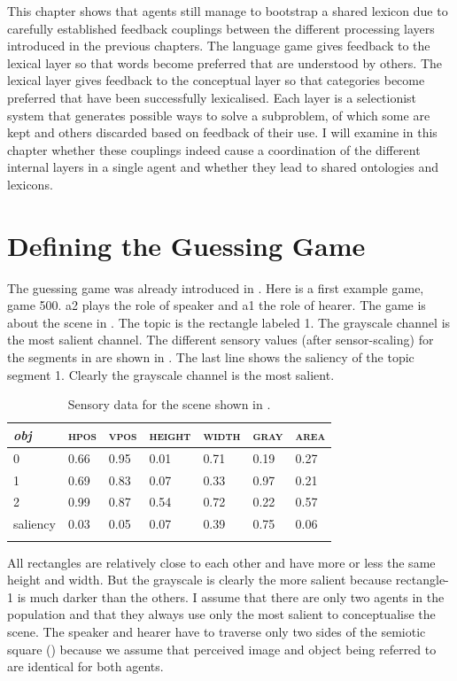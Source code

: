This chapter shows that agents still manage to 
bootstrap a shared lexicon due to carefully established
feedback couplings between the different processing
layers introduced in the previous chapters. 
The language game gives feedback to the lexical layer so 
that words become preferred that are understood by others.
The lexical layer gives feedback to the conceptual layer
so that categories become preferred that have been
successfully lexicalised. Each layer is a selectionist system
that generates possible ways to solve a subproblem, of which some 
are kept and others discarded based on feedback of their use.
I will examine in this chapter whether these
couplings indeed cause a coordination of the different internal
layers in a single agent and whether they lead to shared 
ontologies and lexicons. 

\section{Defining the Guessing Game}

The guessing game was already introduced in . Here is a first example game, game 500.
{\bfshape  a2} plays the role of speaker and {\bfshape  a1} the role of hearer. The game is about the scene in
. The topic is the rectangle labeled 1. The grayscale channel is the most 
salient channel. The different sensory values (after sensor-scaling)
for the segments in  are shown in 
. The last line shows the saliency of 
the topic segment 1.  Clearly the grayscale channel is the most salient. 


\begin{table}
\begin{center}
\begin{tabular}{ l  l  l  l  l  l  l }
\lsptoprule
{\itshape obj} & \textsc{hpos} & \textsc{vpos} & \textsc{height} & \textsc{width} & \textsc{gray} & \textsc{area} \\ \midrule
0 & 0.66 & 0.95 & 0.01 & 0.71 & 0.19 & 0.27\\ 
1 & 0.69 & 0.83 & 0.07 & 0.33 & 0.97 & 0.21\\ 
2 & 0.99 & 0.87 & 0.54 & 0.72 & 0.22 & 0.57\\ 
saliency & 0.03 & 0.05 & 0.07 & 0.39 & 0.75 & 0.06 \\ 
\lspbottomrule
\end{tabular}
\caption{\label{tab:t-rect1}Sensory data for the scene shown in .}
\end{center}
\end{table}
All rectangles are relatively close to each other and have more or less the 
same height and width. But the grayscale is clearly the more salient because rectangle-1 is 
much darker than the others. I assume that there are only two agents in the population and that they always use only 
the most salient to conceptualise the scene. 
The speaker and hearer have to traverse only 
two sides of the semiotic square ()
because we assume that perceived image and object being
referred to are identical for both agents. 



